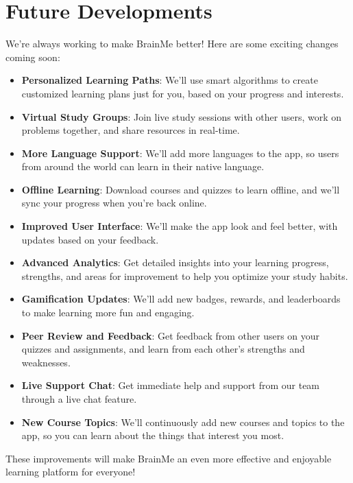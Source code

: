 \section{Future Developments}

We're always working to make BrainMe better! Here are some exciting changes coming soon:

\begin{itemize}
    \item \textbf{Personalized Learning Paths}: We'll use smart algorithms to create customized learning plans just for you, based on your progress and interests.
    \item \textbf{Virtual Study Groups}: Join live study sessions with other users, work on problems together, and share resources in real-time.
    \item \textbf{More Language Support}: We'll add more languages to the app, so users from around the world can learn in their native language.
    \item \textbf{Offline Learning}: Download courses and quizzes to learn offline, and we'll sync your progress when you're back online.
    \item \textbf{Improved User Interface}: We'll make the app look and feel better, with updates based on your feedback.
    \item \textbf{Advanced Analytics}: Get detailed insights into your learning progress, strengths, and areas for improvement to help you optimize your study habits.
    \item \textbf{Gamification Updates}: We'll add new badges, rewards, and leaderboards to make learning more fun and engaging.
    \item \textbf{Peer Review and Feedback}: Get feedback from other users on your quizzes and assignments, and learn from each other's strengths and weaknesses.
    \item \textbf{Live Support Chat}: Get immediate help and support from our team through a live chat feature.
    \item \textbf{New Course Topics}: We'll continuously add new courses and topics to the app, so you can learn about the things that interest you most.
\end{itemize}

These improvements will make BrainMe an even more effective and enjoyable learning platform for everyone!